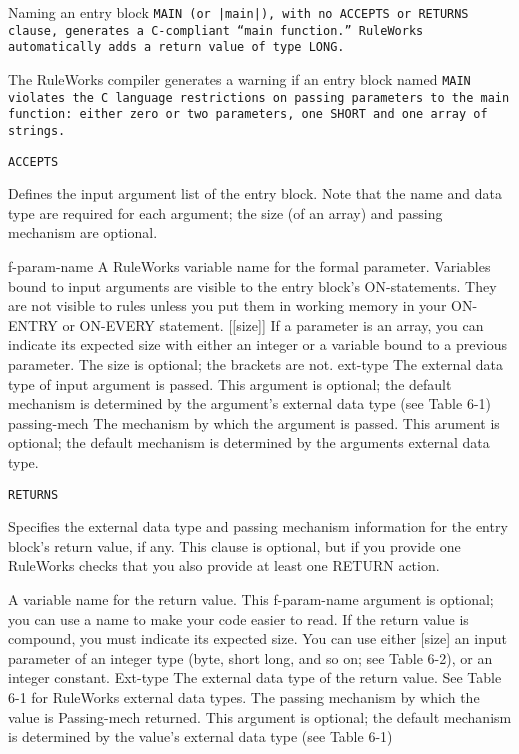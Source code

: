 \begin{note}
  Naming an entry block \tt{MAIN} (or \verb,|main|,), with no
  \tt{ACCEPTS} or \tt{RETURNS} clause, generates a C-compliant ``main
  function.''  RuleWorks automatically adds a return value of type
  \tt{LONG}.
\end{note}

The RuleWorks compiler generates a warning if an entry block named
\tt{MAIN} violates the C language restrictions on passing parameters
to the main function: either zero or two parameters, one \tt{SHORT}
and one array of strings.

\Clauses

\tt{ACCEPTS}

Defines the input argument list of the entry block. Note that the name
and data type are required for each argument; the size (of an array)
and passing mechanism are optional.

f-param-name A RuleWorks variable name for the formal
parameter.
Variables bound to input arguments are visible
to the entry block's ON-statements. They are not
visible to rules unless you put them in working
memory in your ON-ENTRY or ON-EVERY statement.
[[size]]     If a parameter is an array, you can indicate its
expected size with either an integer or a
variable bound to a previous parameter. The size
is optional; the brackets are not.
ext-type     The external data type of input argument is
passed. This argument is optional; the default
mechanism is determined by the argument's
external data type (see Table 6-1)
passing-mech The mechanism by which the argument is passed.
This arument is optional; the default mechanism
is determined by the arguments external data
type.

\tt{RETURNS}

Specifies the external data type and passing mechanism
information for the entry block's return value, if any. This
clause is optional, but if you provide one RuleWorks checks
that you also provide at least one RETURN action.

A variable name for the return value. This
f-param-name argument is optional; you can use a name to make
your code easier to read.
If the return value is compound, you must
indicate its expected size. You can use either
[size]       an input parameter of an integer type (byte,
short long, and so on; see Table 6-2), or an
integer constant.
Ext-type     The external data type of the return value. See
Table 6-1 for RuleWorks external data types.
The passing mechanism by which the value is
Passing-mech returned. This argument is optional; the default
mechanism is determined by the value's external
data type (see Table 6-1)

